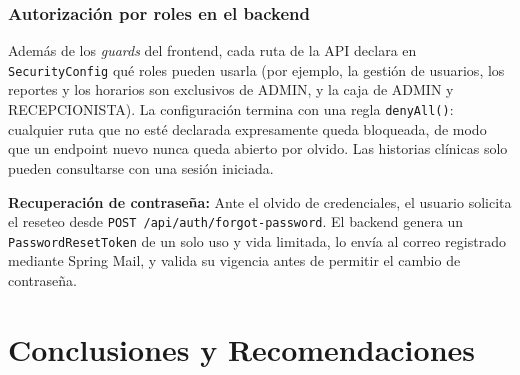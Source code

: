 \documentclass[11pt,a4paper]{report}
\newcommand{\codigoreal}[6]{%
  }
\begin{document}
\codigoreal{codigo/RateLimitFilter.java}{65}{89}{Java}{Límite de intentos de inicio de sesión por IP en RateLimitFilter.java}{lst:rate_limit}

\subsection{Autorización por roles en el backend}
Además de los \textit{guards} del frontend, cada ruta de la API declara en \texttt{SecurityConfig} qué roles pueden usarla (por ejemplo, la gestión de usuarios, los reportes y los horarios son exclusivos de ADMIN, y la caja de ADMIN y RECEPCIONISTA). La configuración termina con una regla \texttt{denyAll()}: cualquier ruta que no esté declarada expresamente queda bloqueada, de modo que un endpoint nuevo nunca queda abierto por olvido. Las historias clínicas solo pueden consultarse con una sesión iniciada.

\textbf{Recuperación de contraseña:} Ante el olvido de credenciales, el usuario solicita el reseteo desde \texttt{POST /api/auth/forgot-password}. El backend genera un \texttt{PasswordResetToken} de un solo uso y vida limitada, lo envía al correo registrado mediante Spring Mail, y valida su vigencia antes de permitir el cambio de contraseña.

\chapter{Conclusiones y Recomendaciones}
\end{document}
